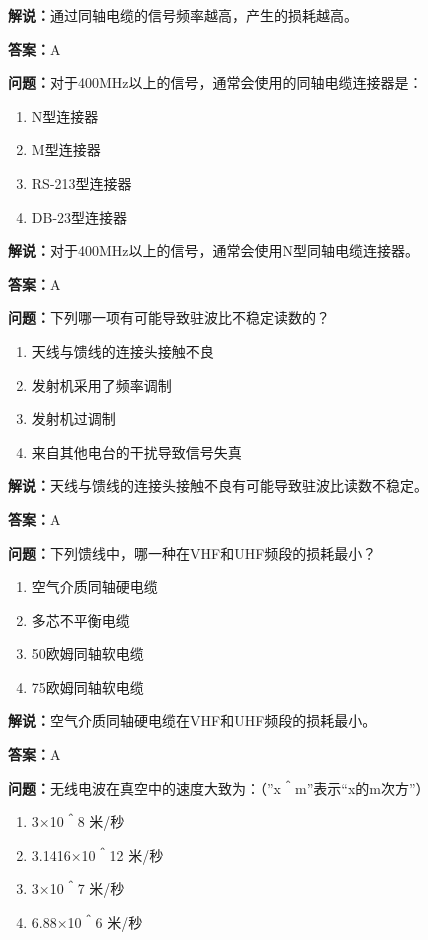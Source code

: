 \textbf{解说：}通过同轴电缆的信号频率越高，产生的损耗越高。%

\textbf{答案：}A

\textbf{问题：}对于400MHz以上的信号，通常会使用的同轴电缆连接器是：

\begin{enumerate}[label=\Alph*), leftmargin=3em]
	\item N型连接器
	\item M型连接器
	\item RS-213型连接器
	\item DB-23型连接器
\end{enumerate}

\textbf{解说：}对于400MHz以上的信号，通常会使用N型同轴电缆连接器。%

\textbf{答案：}A

\textbf{问题：}下列哪一项有可能导致驻波比不稳定读数的？

\begin{enumerate}[label=\Alph*), leftmargin=3em]
	\item 天线与馈线的连接头接触不良
	\item 发射机采用了频率调制
	\item 发射机过调制
	\item 来自其他电台的干扰导致信号失真
\end{enumerate}

\textbf{解说：}天线与馈线的连接头接触不良有可能导致驻波比读数不稳定。%

\textbf{答案：}A

\textbf{问题：}下列馈线中，哪一种在VHF和UHF频段的损耗最小？

\begin{enumerate}[label=\Alph*), leftmargin=3em]
	\item 空气介质同轴硬电缆
	\item 多芯不平衡电缆
	\item 50欧姆同轴软电缆
	\item 75欧姆同轴软电缆
\end{enumerate}

\textbf{解说：}空气介质同轴硬电缆在VHF和UHF频段的损耗最小。%

\textbf{答案：}A

\textbf{问题：}无线电波在真空中的速度大致为：（”x＾m”表示“x的m次方”）

\begin{enumerate}[label=\Alph*), leftmargin=3em]
	\item 3×10＾8 米/秒
	\item 3.1416×10＾12 米/秒
	\item 3×10＾7 米/秒
	\item 6.88×10＾6 米/秒
\end{enumerate}


